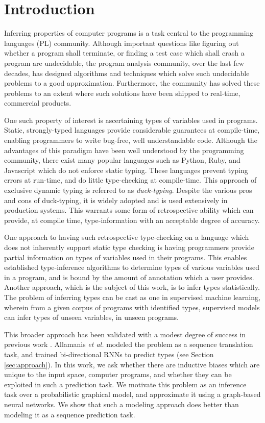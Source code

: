 \section{Introduction}
\label{sec:introduction}
Inferring properties of computer programs is a task central to the programming languages (PL) community. Although important questions like figuring out whether a program shall terminate, or finding a test case which shall crash a program are undecidable, the program analysis community, over the last few decades, has designed algorithms and techniques which solve such undecidable problems to a good approximation. Furthermore, the community has solved these problems to an extent where such solutions have been shipped to real-time, commercial products.

One such property of interest is ascertaining types of variables used in programs. Static, strongly-typed languages provide considerable guarantees at compile-time, enabling programmers to write bug-free, well understandable code. Although the advantages of this paradigm have been well understood by the programming community, there exist many popular languages such as Python, Ruby, and Javascript which do not enforce static typing. These languages prevent typing errors at run-time, and do little type-checking at compile-time. This approach of exclusive dynamic typing is referred to as \textit{duck-typing}. Despite the various pros and cons of duck-typing, it is widely adopted and is used extensively in production systems. This warrants some form of retrospective ability which can provide, at compile time, type-information with an acceptable degree of accuracy.

One approach to having such retrospective type-checking on a language which does not inherently support static type checking is having programmers provide partial information on types of variables used in their programs. This enables established type-inference algorithms to determine types of various variables used in a program, and is bound by the amount of annotation which a user provides. Another approach, which is the subject of this work, is to infer types statistically. The problem of inferring types can be cast as one in supervised machine learning, wherein from a given corpus of programs with identified types, supervised models can infer types of unseen variables, in unseen programs.

This broader approach has been validated with a modest degree of success in previous work \cite{hellendoorn2018deep}. Allamanis \textit{et al.} modeled the problem as a sequence translation task, and trained bi-directional RNNs to predict types (see Section \ref{sec:approach}). In this work, we ask whether there are inductive biases which are unique to the input space, computer programs, and whether they can be exploited in such a prediction task. We motivate this problem as an inference task over a probabilistic graphical model, and approximate it using a graph-based neural networks. We show that such a modeling approach does better than modeling it as a sequence prediction task.


